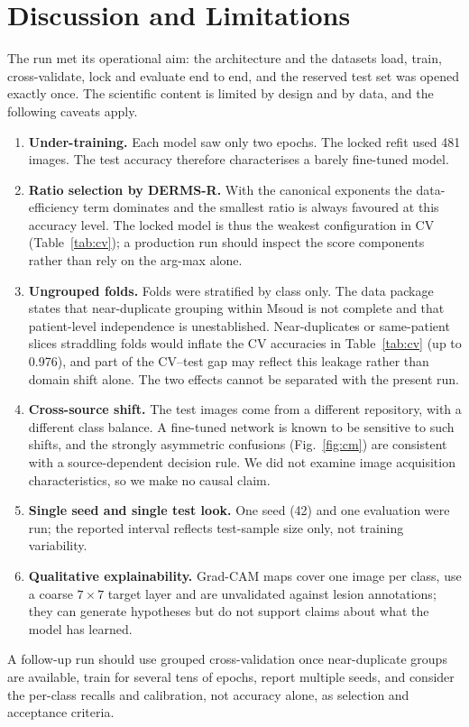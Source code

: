 \documentclass[10pt,a4paper]{article}
\begin{document}
\section{Discussion and Limitations}
The run met its operational aim: the architecture and the datasets load, train, cross-validate, lock and evaluate end to end, and the reserved test set was opened exactly once. The scientific content is limited by design and by data, and the following caveats apply.
\begin{enumerate}
\item \textbf{Under-training.} Each model saw only two epochs. The locked refit used 481 images. The test accuracy therefore characterises a barely fine-tuned model.
\item \textbf{Ratio selection by DERMS-R.} With the canonical exponents the data-efficiency term dominates and the smallest ratio is always favoured at this accuracy level. The locked model is thus the weakest configuration in CV (Table~\ref{tab:cv}); a production run should inspect the score components rather than rely on the arg-max alone.
\item \textbf{Ungrouped folds.} Folds were stratified by class only. The data package states that near-duplicate grouping within Msoud is not complete and that patient-level independence is unestablished. Near-duplicates or same-patient slices straddling folds would inflate the CV accuracies in Table~\ref{tab:cv} (up to 0.976), and part of the CV--test gap may reflect this leakage rather than domain shift alone. The two effects cannot be separated with the present run.
\item \textbf{Cross-source shift.} The test images come from a different repository, with a different class balance. A fine-tuned network is known to be sensitive to such shifts, and the strongly asymmetric confusions (Fig.~\ref{fig:cm}) are consistent with a source-dependent decision rule. We did not examine image acquisition characteristics, so we make no causal claim.
\item \textbf{Single seed and single test look.} One seed (42) and one evaluation were run; the reported interval reflects test-sample size only, not training variability.
\item \textbf{Qualitative explainability.} Grad-CAM maps cover one image per class, use a coarse $7\times7$ target layer and are unvalidated against lesion annotations; they can generate hypotheses but do not support claims about what the model has learned.
\end{enumerate}
A follow-up run should use grouped cross-validation once near-duplicate groups are available, train for several tens of epochs, report multiple seeds, and consider the per-class recalls and calibration, not accuracy alone, as selection and acceptance criteria.
\end{document}
